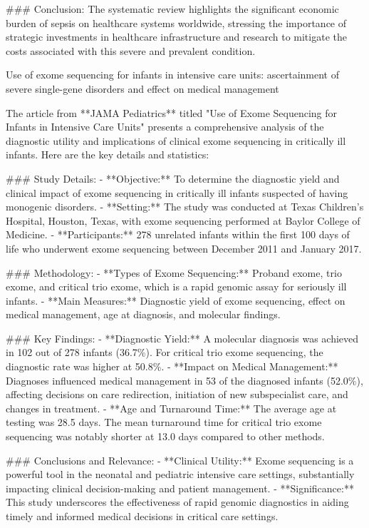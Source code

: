 ### Conclusion:
The systematic review highlights the significant economic burden of sepsis on healthcare systems worldwide, stressing the importance of strategic investments in healthcare infrastructure and research to mitigate the costs associated with this severe and prevalent condition.


\citep{meng2017use}
Use of exome sequencing for infants in intensive care units: ascertainment of severe single-gene disorders and effect on medical management

The article from **JAMA Pediatrics** titled "Use of Exome Sequencing for Infants in Intensive Care Units" presents a comprehensive analysis of the diagnostic utility and implications of clinical exome sequencing in critically ill infants. Here are the key details and statistics:

### Study Details:
- **Objective:** To determine the diagnostic yield and clinical impact of exome sequencing in critically ill infants suspected of having monogenic disorders.
- **Setting:** The study was conducted at Texas Children’s Hospital, Houston, Texas, with exome sequencing performed at Baylor College of Medicine.
- **Participants:** 278 unrelated infants within the first 100 days of life who underwent exome sequencing between December 2011 and January 2017.

### Methodology:
- **Types of Exome Sequencing:** Proband exome, trio exome, and critical trio exome, which is a rapid genomic assay for seriously ill infants.
- **Main Measures:** Diagnostic yield of exome sequencing, effect on medical management, age at diagnosis, and molecular findings.

### Key Findings:
- **Diagnostic Yield:** A molecular diagnosis was achieved in 102 out of 278 infants (36.7\%). For critical trio exome sequencing, the diagnostic rate was higher at 50.8\%.
- **Impact on Medical Management:** Diagnoses influenced medical management in 53 of the diagnosed infants (52.0\%), affecting decisions on care redirection, initiation of new subspecialist care, and changes in treatment.
- **Age and Turnaround Time:** The average age at testing was 28.5 days. The mean turnaround time for critical trio exome sequencing was notably shorter at 13.0 days compared to other methods.

### Conclusions and Relevance:
- **Clinical Utility:** Exome sequencing is a powerful tool in the neonatal and pediatric intensive care settings, substantially impacting clinical decision-making and patient management.
- **Significance:** This study underscores the effectiveness of rapid genomic diagnostics in aiding timely and informed medical decisions in critical care settings.

